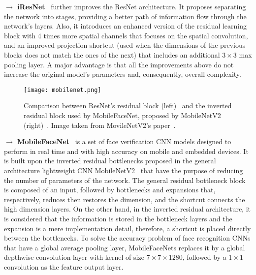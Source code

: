 \documentclass[class=report, crop=false, a4paper, 12pt]{standalone}
\begin{document}
\vspace{0.7\baselineskip}
\noindent\textbf{$\rightarrow$ iResNet}~\autocite{dutaImprovedResidualNetworks2021} further improves the ResNet architecture. It proposes separating the network into stages, providing a better path of information flow through the network's layers. Also, it introduces an enhanced version of the residual learning block with 4 times more spatial channels that focuses on the spatial convolution, and an improved projection shortcut (used when the dimensions of the previous blocks does not match the ones of the next) that includes an additional $3\times3$ max pooling layer. A major advantage is that all the improvements above do not increase the original model's parameters and, consequently, overall complexity.

\vspace{0.7\baselineskip}
\begin{figure}[H]
    \centering
    \texttt{[image: mobilenet.png]}
    \caption[Comparison between ResNet's residual block and the inverted residual block proposed by MobileNetV2.]{Comparison between ResNet's residual block (left)~\autocite{chenMobileFaceNetsEfficientCNNs2018} and the inverted residual block used by MobileFaceNet, proposed by MobileNetV2 (right)~\autocite{sandlerMobileNetV2InvertedResiduals2019}. Image taken from MovileNetV2's paper~\autocite{sandlerMobileNetV2InvertedResiduals2019}.}
    \label{fig:mobilefacenet}
\end{figure}

\label{mobilefacenet}
\noindent\textbf{$\rightarrow$ MobileFaceNet}~\autocite{chenMobileFaceNetsEfficientCNNs2018} is a set of face verification CNN models designed to perform in real time and with high accuracy on mobile and embedded devices. It is built upon the inverted residual bottlenecks  proposed in the general architecture lightweight CNN MobileNetV2~\autocite{sandlerMobileNetV2InvertedResiduals2019} that have the purpose of reducing the number of parameters of the network. The general residual bottleneck block~\autocite{heDeepResidualLearning2016} is composed of an input, followed by bottlenecks and expansions that, respectively, reduces then restores the dimension, and the shortcut connects the high dimension layers. On the other hand, in the inverted residual architecture, it is considered that the information is stored in the bottleneck layers and the expansion is a mere implementation detail, therefore, a shortcut is placed directly between the bottlenecks. To solve the accuracy problem of face recognition CNNs that have a global average pooling layer, MobileFaceNets replaces it by a global depthwise convolution layer with kernel of size $7\times7\times1280$, followed by a $1\times1$ convolution as the feature output layer.
\end{document}
